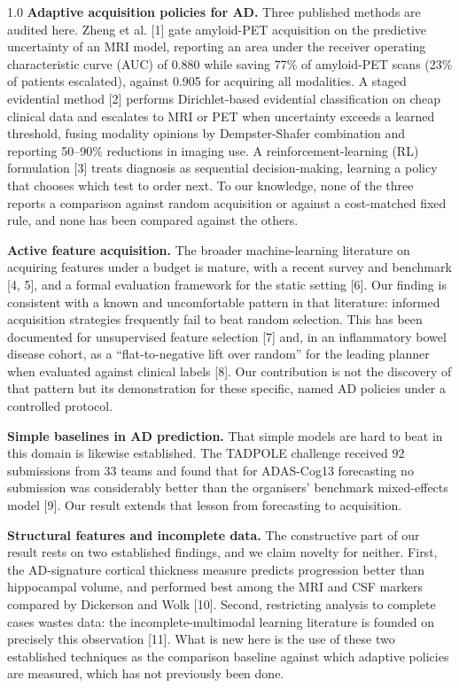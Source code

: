 \documentclass[12pt,twoside]{article}
\begin{document}
\begin{spacing}{1.0}
\textbf{Adaptive acquisition policies for AD.} Three published methods are
audited here. Zheng et al. [1] gate amyloid-PET acquisition on the
predictive uncertainty of an MRI model, reporting an area under the receiver
operating characteristic curve (AUC) of 0.880 while saving 77\% of amyloid-PET
scans (23\% of patients escalated), against 0.905 for acquiring all
modalities. A staged evidential method [2] performs Dirichlet-based
evidential classification on cheap clinical data and escalates to MRI or
PET when uncertainty exceeds a learned threshold, fusing modality opinions
by Dempster-Shafer combination and reporting 50--90\% reductions in imaging
use. A reinforcement-learning (RL) formulation [3] treats diagnosis as sequential
decision-making, learning a policy that chooses which test to order next.
To our knowledge, none of the three reports a comparison against random
acquisition or against a cost-matched fixed rule, and none has been compared against the others.

\textbf{Active feature acquisition.} The broader machine-learning
literature on acquiring features under a budget is mature, with a recent
survey and benchmark [4, 5], and a formal evaluation framework for the
static setting [6]. Our finding is consistent with a
known and uncomfortable pattern in that literature: informed acquisition
strategies frequently fail to beat random selection. This has been
documented for unsupervised feature selection [7] and, in an
inflammatory bowel disease cohort, as a ``flat-to-negative lift over random''
for the leading planner when evaluated against clinical labels [8]. Our
contribution is not the discovery of that pattern but its demonstration for these specific,
named AD policies under a controlled protocol.

\textbf{Simple baselines in AD prediction.} That simple models are hard to
beat in this domain is likewise established. The TADPOLE challenge received
92 submissions from 33 teams and found that for ADAS-Cog13 forecasting no
submission was considerably better than the organisers' benchmark
mixed-effects model [9]. Our result extends that lesson from forecasting to acquisition.

\textbf{Structural features and incomplete data.} The constructive part of
our result rests on two established findings, and we claim novelty for
neither. First, the AD-signature cortical thickness measure predicts
progression better than hippocampal volume, and performed best among the
MRI and CSF markers compared by Dickerson and Wolk [10]. Second,
restricting analysis to complete cases wastes data: the incomplete-multimodal
learning literature is founded on precisely this observation [11]. What is
new here is the use of these two established techniques as the comparison
baseline against which adaptive policies are measured, which has not
previously been done.


\end{spacing}
\end{document}
